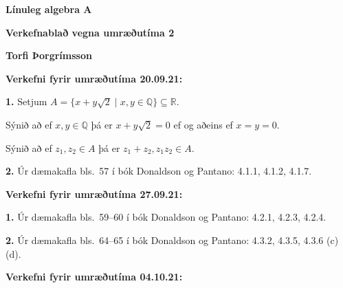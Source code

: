\documentclass[12pt]{article}
\begin{document}
\pagestyle{empty}


\newcommand{\Ov}{\mbox{${\bf 0}$}}
\newcommand{\rv}{\mbox{${\bf r}$}}
\newcommand{\vv}{\mbox{${\bf v}$}}
\newcommand{\xv}{\mbox{${\bf x}$}}
\newcommand{\yv}{\mbox{${\bf y}$}}
\newcommand{\av}{\mbox{${\bf a}$}}
\newcommand{\bv}{\mbox{${\bf b}$}}
\newcommand{\cv}{\mbox{${\bf c}$}}
\newcommand{\iv}{\mbox{${\bf i}$}}
\newcommand{\jv}{\mbox{${\bf j}$}}
\newcommand{\kv}{\mbox{${\bf k}$}}

\newcommand{\ZZ}{\mbox{$\mathbb{Z}$}}
\newcommand{\NN}{\mbox{$\mathbb{N}$}}
\newcommand{\QQ}{\mbox{$\mathbb{Q}$}}
\newcommand{\RR}{\mbox{$\mathbb{R}$}}
\newcommand{\CC}{\mbox{$\mathbb{C}$}}

\newcommand{\RRk}{\mbox{$\mathbb{R}^k$}}
\newcommand{\RRn}{\mbox{$\mathbb{R}^n$}}
\newcommand{\RRm}{\mbox{$\mathbb{R}^m$}}

\centerline{\bf \Huge Línuleg algebra A}
\medskip
\centerline{\bf \Large Verkefnablað vegna umræðutíma 2}

\medskip



{\bf Torfi Þorgrímsson}




\medskip

{\bf Verkefni fyrir umræðutíma 20.09.21:}  

\smallskip

{\bf 1.}  Setjum $A=\{x+y\sqrt{2}\mid x,y\in \QQ\}\subseteq\RR$.  

Sýnið að ef $x,y\in\QQ$ þá er $x+y\sqrt{2}=0$ ef og aðeins ef $x=y=0$.

Sýnið að ef $z_1, z_2\in A$ þá er $z_1+z_2, z_1z_2\in A$.

\smallskip
  
{\bf 2.}  Úr dæmakafla bls.~57 í bók Donaldson og Pantano:  4.1.1, 4.1.2, 4.1.7. 

\bigskip

{\bf Verkefni fyrir umræðutíma 27.09.21:}  

\smallskip

{\bf 1.}  Úr dæmakafla bls.~59--60 í bók Donaldson og Pantano:  4.2.1, 4.2.3, 4.2.4.  

\smallskip

{\bf 2.}  Úr dæmakafla bls.~64--65 í bók Donaldson og Pantano:  4.3.2, 4.3.5, 4.3.6 (c)(d). 


\bigskip

{\bf Verkefni fyrir umræðutíma 04.10.21:} 

\smallskip
\end{document}
